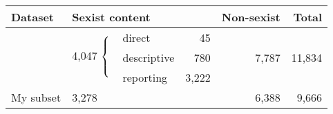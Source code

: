 \begin{tabular}{@{}lllrrr@{}}
\toprule
\textbf{Dataset} & \multicolumn{3}{l}{\textbf{Sexist content}} & \textbf{Non-sexist} & \textbf{Total} \\
\midrule
\multirow{3}{*}{\citet{chiril2020annotated}} & \multirow{3}{*}{4,047 $\begin{dcases} \\ \\ \\ \end{dcases}$} & direct & 45 & \multirow{3}{*}{7,787} & \multirow{3}{*}{11,834} \\
 &  & descriptive & 780 &  &  \\
 &  & reporting & 3,222 &  &  \\
\midrule
My subset & \multicolumn{3}{l}{3,278} & 6,388 & 9,666 \\
\bottomrule
\end{tabular}
